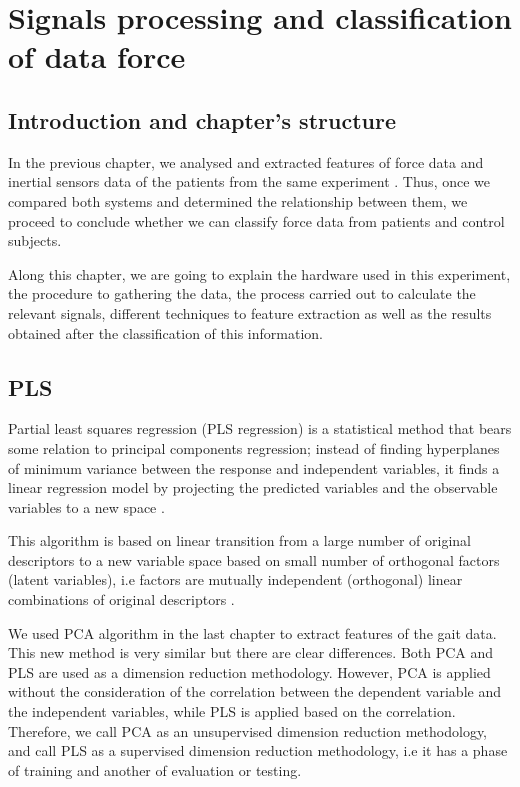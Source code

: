 \chapter{Signals processing and classification of data force}
\label{ch:forceData}

\section{Introduction and chapter's structure}
In the previous chapter, we analysed and extracted features of force data and inertial sensors data of the patients from the same experiment . Thus, once we compared both systems and determined the relationship between them, we proceed to conclude whether we can classify force data from patients and control subjects.

Along this chapter, we are going to explain the hardware used in this experiment, the procedure to gathering the data, the process carried out to calculate the relevant signals, different techniques to feature extraction as well as the results obtained after the classification of this information.

\section{PLS}
Partial least squares regression (PLS regression) is a statistical method that bears some relation to principal components regression; instead of finding hyperplanes of minimum variance between the response and independent variables, it finds a linear regression model by projecting the predicted variables and the observable variables to a new space \cite{pls_pca}. 

This algorithm is based on linear transition from a large number of original descriptors to a new variable space based on small number of orthogonal factors (latent variables), i.e factors are mutually independent (orthogonal) linear combinations of original descriptors \cite{pls_pca} .

We used PCA algorithm in the last chapter to extract features of the gait data. This new method is very similar but there are clear differences. Both PCA and PLS are used as a dimension reduction methodology. However, PCA is applied without the consideration of the correlation between the dependent variable and the independent variables, while PLS is applied based on the correlation. Therefore, we call PCA as an unsupervised dimension reduction methodology, and call PLS as a supervised dimension reduction methodology, i.e it has a phase of training and another of evaluation or testing\cite{pls_pca}.

